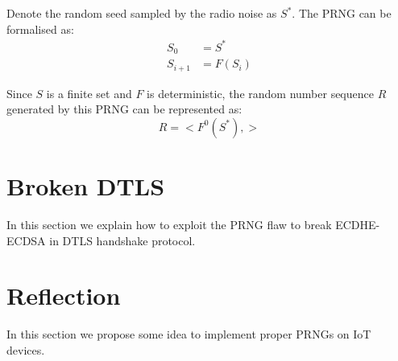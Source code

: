Denote the random seed sampled by the radio noise as $S^*$. The PRNG can be formalised as:
\begin{equation}
	\begin{aligned}
	S_{0} &= S^* \\
	S_{i+1} &= F(S_{i})
	\end{aligned}
\end{equation}

Since ${S}$ is a finite set and $F$ is deterministic, the random number sequence $R$ generated by this PRNG can be represented as:
\begin{equation}
R= <F^0(S^{*}), >
\end{equation}

\section{Broken DTLS}
In this section we explain how to exploit the PRNG flaw to break ECDHE-ECDSA in DTLS handshake protocol.

\section{Reflection}
In this section we propose some idea to implement proper PRNGs on IoT devices.